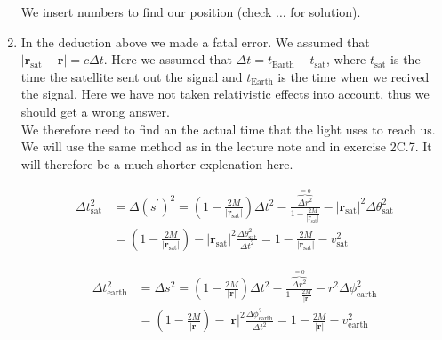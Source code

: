 \documentclass[a4paper,10pt,english]{article}
\begin{document}
\begin{enumerate}
We insert numbers to find our position (check $\ldots$ for solution).

\item In the deduction above we made a fatal error. We assumed that $|\textbf{r}_{\text{sat}}-\textbf{r}|=c\Delta t$. Here we assumed that $\Delta t=t_{\text{Earth}}-t_{\text{sat}}$, where $t_{\text{sat}}$ is the time the satellite sent out the signal and $t_{\text{Earth}}$ is the time when we recived the signal. Here we have not taken relativistic effects into account, thus we should get a wrong answer.
\\
We therefore need to find an the actual time that the light uses to reach us. We will use the same method as in the lecture note and in exercise 2C.7. It will therefore be a much shorter explenation here.

\begin{align*}
\Delta t_{\text{sat}}^{2}&=\Delta (s^{\prime})^{2}=\left(1-\frac{2M}{|\textbf{r}_{\text{sat}}|}\right)\Delta t^{2}-\frac{\overbrace{\Delta r^{2}}^{=0}}{1-\frac{2M}{|\textbf{r}_{\text{sat}}|}}-|\textbf{r}_{\text{sat}}|^{2}\Delta\theta^{2}_{\text{sat}}\\
&=\left(1-\frac{2M}{|\textbf{r}_{\text{sat}}|}\right)-|\textbf{r}_{\text{sat}}|^{2}\frac{\Delta\theta^{2}_{\text{sat}}}{\Delta t^{2}}=1-\frac{2M}{|\textbf{r}_{\text{sat}}|}-v_{\text{sat}}^{2}
\end{align*}

\begin{align*}
\Delta t_{\text{earth}}^{2}&=\Delta s^{2}=\left(1-\frac{2M}{|\textbf{r}|}\right)\Delta t^{2}-\frac{\overbrace{\Delta r^{2}}^{=0}}{1-\frac{2M}{|\textbf{r}|}}-r^{2}\Delta\phi^{2}_{\text{earth}}\\
&=\left(1-\frac{2M}{|\textbf{r}|}\right)-|\textbf{r}|^{2}\frac{\Delta\phi^{2}_{\text{earth}}}{\Delta t^{2}}=1-\frac{2M}{|\textbf{r}|}-v_{\text{earth}}^{2}
\end{align*}


\end{enumerate}
\end{document}
